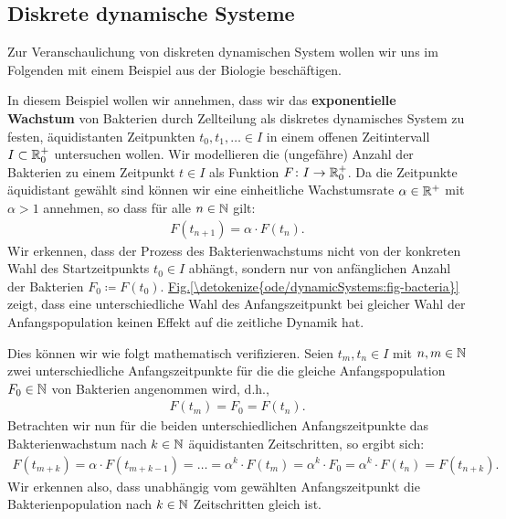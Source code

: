 \subsection{Diskrete dynamische Systeme}
\label{\detokenize{ode/dynamicSystems:diskrete-dynamische-systeme}}
Zur Veranschaulichung von diskreten dynamischen System wollen wir uns im Folgenden mit einem Beispiel aus der Biologie beschäftigen.
\label{ode/dynamicSystems:ex:bacteria}
\begin{example}{}{}



In diesem Beispiel wollen wir annehmen, dass wir das \textbf{exponentielle Wachstum} von Bakterien durch Zellteilung als diskretes dynamisches System zu festen, äquidistanten Zeitpunkten \(t_0, t_1, \ldots \in I\) in einem offenen Zeitintervall \(I\subset\mathbb{R}^+_0\) untersuchen wollen.
Wir modellieren die (ungefähre) Anzahl der Bakterien zu einem Zeitpunkt \(t \in I\) als Funktion \(F \colon I \rightarrow \mathbb{R}_0^+\).
Da die Zeitpunkte äquidistant gewählt sind können wir eine einheitliche Wachstumsrate \(\alpha \in \mathbb{R}^+\) mit \(\alpha > 1\) annehmen, so dass für alle \(n \in \mathbb{N}\) gilt:
\begin{align*}
F(t_{n+1}) = \alpha \cdot F(t_n).
\end{align*}
Wir erkennen, dass der Prozess des Bakterienwachstums nicht von der konkreten Wahl des Startzeitpunkts \(t_0 \in I\) abhängt, sondern nur von anfänglichen Anzahl der Bakterien \(F_0 \coloneqq F(t_0)\). \hyperref[\detokenize{ode/dynamicSystems:fig-bacteria}]{Fig.\@ \ref{\detokenize{ode/dynamicSystems:fig-bacteria}}} zeigt, dass eine unterschiedliche Wahl des Anfangszeitpunkt bei gleicher Wahl der Anfangspopulation keinen Effekt auf die zeitliche Dynamik hat.

Dies können wir wie folgt mathematisch verifizieren. Seien \(t_m, t_n \in I\) mit \(n,m \in \mathbb{N}\) zwei unterschiedliche Anfangszeitpunkte für die die gleiche Anfangspopulation \(F_0 \in \mathbb{N}\) von Bakterien angenommen wird, d.h.,
\begin{align*}
F(t_m) = F_0 = F(t_n).
\end{align*}
Betrachten wir nun für die beiden unterschiedlichen Anfangszeitpunkte das Bakterienwachstum nach \(k \in \mathbb{N}\) äquidistanten Zeitschritten, so ergibt sich:
\begin{align*}
F(t_{m+k}) = \alpha \cdot F(t_{m+k-1}) = \ldots = \alpha^k \cdot F(t_{m}) = \alpha^k \cdot F_0 = \alpha^k \cdot F(t_n) = F(t_{n+k}).
\end{align*}
Wir erkennen also, dass unabhängig vom gewählten Anfangszeitpunkt die Bakterienpopulation nach \(k \in \mathbb{N}\) Zeitschritten gleich ist.
\end{example}

